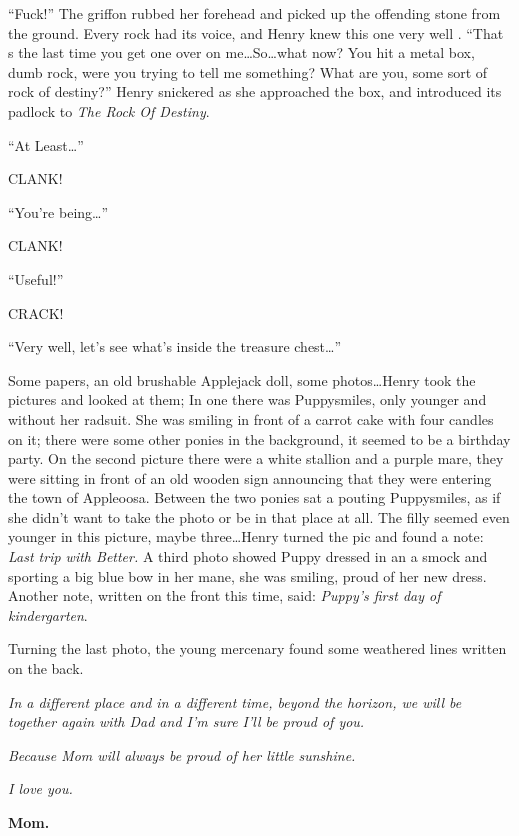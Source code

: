 ``Fuck!'' The griffon rubbed her forehead and picked up the offending stone from the ground. Every rock had its voice, and Henry knew this one very well . ``That s the last time you get one over on me\dots So\dots what now? You hit a metal box, dumb rock, were you trying to tell me something? What are you, some sort of rock of destiny?'' Henry snickered as she approached the box, and introduced its padlock to \emph{The Rock Of Destiny}.

``At Least\dots''

CLANK!

``You're being\dots''

CLANK!

``Useful!''

CRACK!

``Very well, let's see what's inside the treasure chest\dots''

Some papers, an old brushable Applejack doll, some photos\dots Henry took the pictures and looked at them; In one there was Puppysmiles, only younger and without her radsuit. She was smiling in front of a carrot cake with four candles on it; there were some other ponies in the background, it seemed to be a birthday party. On the second picture there were a white stallion and a purple mare, they were sitting in front of an old wooden sign announcing that they were entering the town of Appleoosa. Between the two ponies sat a pouting Puppysmiles, as if she didn't want to take the photo or be in that place at all. The filly seemed even younger in this picture, maybe three\dots Henry turned the pic and found a note: \emph{Last trip with Better.} A third photo showed Puppy dressed in an a smock and sporting a big blue bow in her mane, she was smiling, proud of her new dress. Another note, written on the front this time, said: \emph{Puppy's first day of kindergarten}.

Turning the last photo, the young mercenary found some weathered lines written on the back.

\medskip

\emph{In a different place and in a different time, beyond the horizon, we will be together again with Dad and I'm sure I'll be proud of you.}

\emph{Because Mom will always be proud of her little sunshine.}

\emph{I love you.}

\begin{flushright}
    \textbf{Mom.}
\end{flushright}

